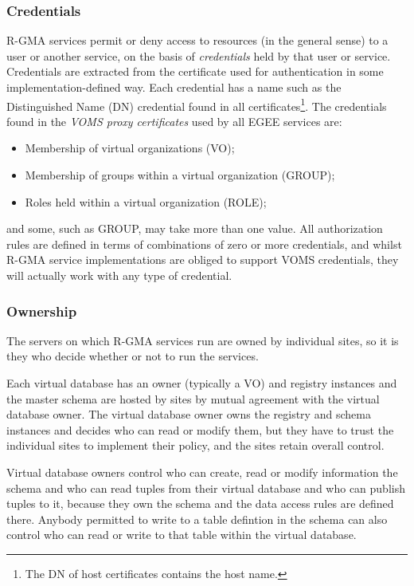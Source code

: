 \subsubsection{Credentials}

R-GMA services permit or deny access to resources (in the general
sense) to a user or another service, on the basis of
\textit{credentials} held by that user or service. Credentials are
extracted from the certificate used for authentication in some
implementation-defined way. Each credential has a name such as the
{Distinguished Name} (DN) credential found in all
certificates\footnote{The DN of host certificates contains the host
name.}.  The credentials found in the \textit{VOMS proxy certificates}
used by all EGEE services are:

\begin{itemize}
\item Membership of virtual organizations (VO);
\item Membership of groups within a virtual organization (GROUP);
\item Roles held within a virtual organization (ROLE);
\end{itemize}

and some, such as GROUP, may take more than one value.  All
authorization rules are defined in terms of combinations of zero or
more credentials, and whilst R-GMA service implementations are obliged
to support VOMS credentials, they will actually work with any type of
credential.

\subsubsection{Ownership}

The servers on which R-GMA services run are owned by individual
sites, so it is they who decide whether or not to run the
services. 

Each virtual database has an owner (typically a VO) and registry 
instances and the master schema are hosted by sites by mutual agreement with the
virtual database owner. The virtual database owner owns the registry and schema instances and
decides who can read or modify them, but they have to trust the individual
sites to implement their policy, and the sites retain overall control.

Virtual database owners control who can create, read or modify information
the schema and who can read tuples from their virtual database and who can
publish tuples to it, because they own the schema and the data access rules are
defined there. Anybody permitted to write to a table defintion in the
schema can also control who can read or write to that table within the virtual
database.

